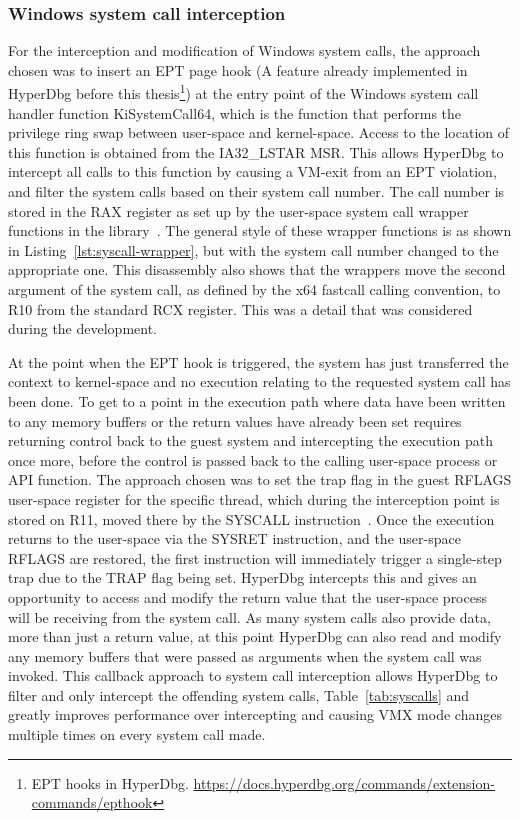 \subsubsection{Windows system call interception}\label{syscall_interception}
For the interception and modification of Windows system calls, the approach chosen was to insert an EPT page hook (A feature already implemented in HyperDbg before this thesis\footnote{EPT hooks in HyperDbg. \url{https://docs.hyperdbg.org/commands/extension-commands/epthook}}) 
at the entry point of the Windows system call handler function KiSystemCall64, which is the function that performs the privilege ring swap between user-space and kernel-space. 
Access to the location of this function is obtained from the IA32\_LSTAR MSR. 
This allows HyperDbg to intercept all calls to this function by causing a VM-exit from an EPT violation, and filter the system calls based on their system call number. 
The call number is stored in the RAX register as set up by the user-space system call wrapper functions in the  library~\cite{ntdll-lib}. The general style of these 
wrapper functions is as shown in Listing~\ref{lst:syscall-wrapper}, but with the system call number changed to the appropriate one.
This disassembly also shows that the wrappers move the second argument of the system call, as defined by the x64 fastcall calling convention, 
to R10 from the standard RCX register. This was a detail that was considered during the development.

At the point when the EPT hook is triggered, the system has just transferred the context to kernel-space and no execution relating to the requested system call has been done. 
To get to a point in the execution path where data have been written to any memory buffers or the return values have already been set 
requires returning control back to the guest system and intercepting the execution path once more, before the control is passed back to the calling user-space process or API function. 
The approach chosen was to set the trap flag in the guest RFLAGS user-space register for the specific thread, which during the interception point is stored on R11, moved there by the SYSCALL instruction~\cite[Volume 2B]{Intel-SDM2025}. 
Once the execution returns to the user-space via the SYSRET instruction, and the user-space RFLAGS are restored, the first instruction will immediately trigger a single-step trap due to the TRAP flag
being set. HyperDbg intercepts this and gives an opportunity to access and modify the return value that the user-space process will be receiving from the system call. 
As many system calls also provide data, more than just a return value, at this point HyperDbg can also read and modify any memory buffers that were 
passed as arguments when the system call was invoked. This callback approach to system call interception allows HyperDbg to filter and only intercept 
the offending system calls, Table~\ref{tab:syscalls} and greatly improves performance over intercepting and causing VMX mode changes multiple times on every system call made.

